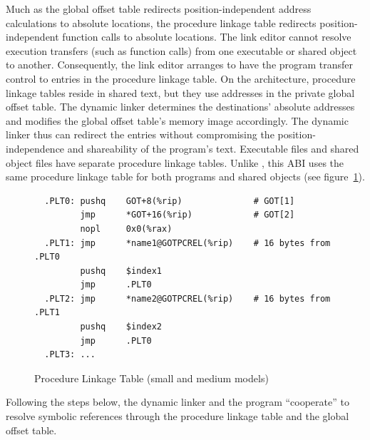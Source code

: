 Much as the global offset table redirects position-independent address
calculations to absolute locations, the procedure linkage table
redirects position-independent function calls to absolute locations.
The link editor cannot resolve execution transfers (such as function
calls) from one executable or shared object to another.  Consequently,
the link editor arranges to have the program transfer control to
entries in the procedure linkage table.  On the \xARCH architecture,
procedure linkage tables reside in shared text, but they use addresses
in the private global offset table.  The dynamic linker determines the
destinations' absolute addresses and modifies the global offset
table's memory image accordingly.  The dynamic linker thus can
redirect the entries without compromising the position-independence
and shareability of the program's text.  Executable files and shared
object files have separate procedure linkage tables.  Unlike
\intelabi, this ABI uses the same procedure linkage table for both
programs and shared objects (see figure~\ref{small_med_plt}).

\begin{figure}[H]
\Hrule
\caption{Procedure Linkage Table (small and medium models)}
\label{small_med_plt}
\begin{footnotesize}
\begin{verbatim}
  .PLT0: pushq    GOT+8(%rip)              # GOT[1]
         jmp      *GOT+16(%rip)            # GOT[2]
         nopl     0x0(%rax)
  .PLT1: jmp      *name1@GOTPCREL(%rip)    # 16 bytes from .PLT0
         pushq    $index1
         jmp      .PLT0
  .PLT2: jmp      *name2@GOTPCREL(%rip)    # 16 bytes from .PLT1
         pushq    $index2
         jmp      .PLT0
  .PLT3: ...
\end{verbatim}%
\end{footnotesize}
\Hrule
\end{figure}

Following the steps below, the dynamic linker and the program
``cooperate'' to resolve symbolic references through the procedure
linkage table and the global offset table.

